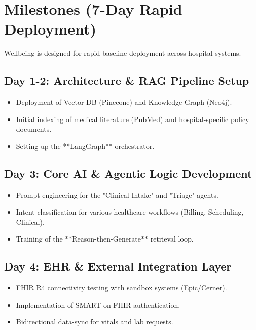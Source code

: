 \documentclass[12pt,a4paper]{article}
\begin{document}
\section{Milestones (7-Day Rapid Deployment)}
Wellbeing is designed for rapid baseline deployment across hospital systems.

\subsection{Day 1-2: Architecture \& RAG Pipeline Setup}
\begin{itemize}
    \item Deployment of Vector DB (Pinecone) and Knowledge Graph (Neo4j).
    \item Initial indexing of medical literature (PubMed) and hospital-specific policy documents.
    \item Setting up the **LangGraph** orchestrator.
\end{itemize}

\subsection{Day 3: Core AI \& Agentic Logic Development}
\begin{itemize}
    \item Prompt engineering for the "Clinical Intake" and "Triage" agents.
    \item Intent classification for various healthcare workflows (Billing, Scheduling, Clinical).
    \item Training of the **Reason-then-Generate** retrieval loop.
\end{itemize}

\subsection{Day 4: EHR \& External Integration Layer}
\begin{itemize}
    \item FHIR R4 connectivity testing with sandbox systems (Epic/Cerner).
    \item Implementation of SMART on FHIR authentication.
    \item Bidirectional data-sync for vitals and lab requests.
\end{itemize}
\end{document}
